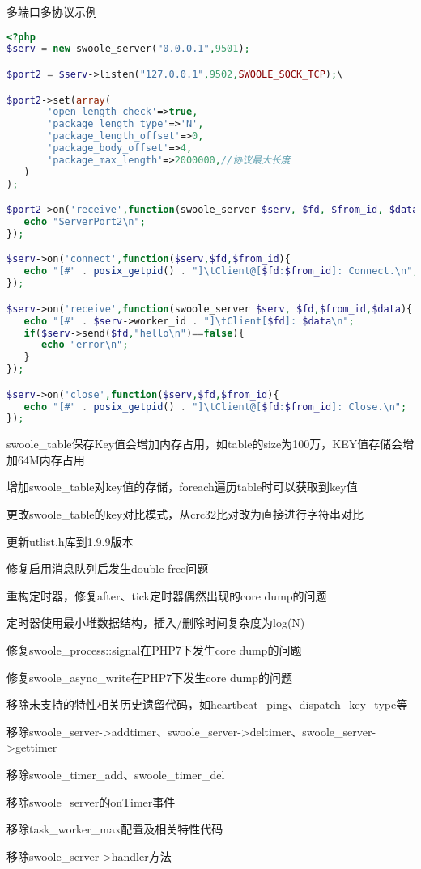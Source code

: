 \begin{example}
多端口多协议示例
\begin{lstlisting}[language=PHP]
<?php
$serv = new swoole_server("0.0.0.1",9501);

$port2 = $serv->listen("127.0.0.1",9502,SWOOLE_SOCK_TCP);\

$port2->set(array(
       'open_length_check'=>true,
       'package_length_type'=>'N',
       'package_length_offset'=>0,
       'package_body_offset'=>4,
       'package_max_length'=>2000000,//协议最大长度
   )
);

$port2->on('receive',function(swoole_server $serv, $fd, $from_id, $data){
   echo "ServerPort2\n";
});

$serv->on('connect',function($serv,$fd,$from_id){
   echo "[#" . posix_getpid() . "]\tClient@[$fd:$from_id]: Connect.\n";
});

$serv->on('receive',function(swoole_server $serv, $fd,$from_id,$data){
   echo "[#" . $serv->worker_id . "]\tClient[$fd]: $data\n";
   if($serv->send($fd,"hello\n")==false){
      echo "error\n";
   }
});

$serv->on('close',function($serv,$fd,$from_id){
   echo "[#" . posix_getpid() . "]\tClient@[$fd:$from_id]: Close.\n";
});
\end{lstlisting}
\end{example}

swoole\_table保存Key值会增加内存占用，如table的size为100万，KEY值存储会增加64M内存占用

\begin{compactitem}
\item 增加swoole\_table对key值的存储，foreach遍历table时可以获取到key值
\item 更改swoole\_table的key对比模式，从crc32比对改为直接进行字符串对比
\item 更新utlist.h库到1.9.9版本
\item 修复启用消息队列后发生double-free问题
\item 重构定时器，修复after、tick定时器偶然出现的core dump的问题
\item 定时器使用最小堆数据结构，插入/删除时间复杂度为log(N)
\item 修复swoole\_process::signal在PHP7下发生core dump的问题
\item 修复swoole\_async\_write在PHP7下发生core dump的问题
\item 移除未支持的特性相关历史遗留代码，如heartbeat\_ping、dispatch\_key\_type等
\item 移除swoole\_server->addtimer、swoole\_server->deltimer、swoole\_server->gettimer
\item 移除swoole\_timer\_add、swoole\_timer\_del
\item 移除swoole\_server的onTimer事件
\item 移除task\_worker\_max配置及相关特性代码
\item 移除swoole\_server->handler方法
\end{compactitem}


